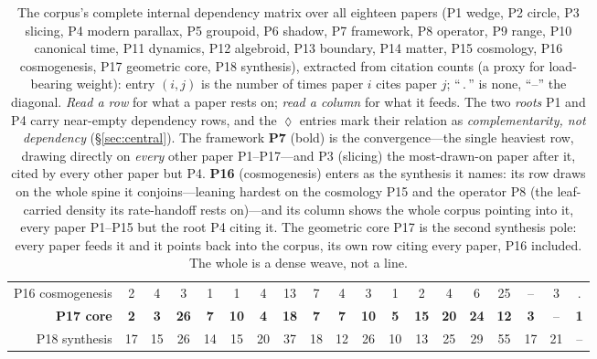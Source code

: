 \documentclass[11pt,a4paper]{article}
\theoremstyle{plain}
\theoremstyle{definition}
\theoremstyle{remark}
\begin{document}
\begin{table}[ht]
{\begin{tabular}{r|cccccccccccccccccc}
P16 \; cosmogenesis & 2 & 4 & 3 & 1 & 1 & 4 & 13 & 7 & 4 & 3 & 1 & 2 & 4 & 6 & 25 & -- & 3 & .\\
\textbf{P17 \; core} & \textbf{2} & \textbf{3} & \textbf{26} & \textbf{7} & \textbf{10} & \textbf{4} & \textbf{18} & \textbf{7} & \textbf{7} & \textbf{10} & \textbf{5} & \textbf{15} & \textbf{20} & \textbf{24} & \textbf{12} & \textbf{3} & -- & \textbf{1}\\
P18 \; synthesis & 17 & 15 & 26 & 14 & 15 & 20 & 37 & 18 & 12 & 26 & 10 & 13 & 25 & 29 & 55 & 17 & 21 & --\\
\end{tabular}%
}
\caption{The corpus's complete internal dependency matrix over all eighteen papers (P1 wedge, P2 circle, P3 slicing, P4 modern parallax, P5 groupoid, P6 shadow, P7 framework, P8 operator, P9 range, P10 canonical time, P11 dynamics, P12 algebroid, P13 boundary, P14 matter, P15 cosmology, P16 cosmogenesis, P17 geometric core, P18 synthesis), extracted from citation counts (a proxy for load-bearing weight): entry $(i,j)$ is the number of times paper $i$ cites paper $j$; ``\,.\,'' is none, ``--'' the diagonal. \emph{Read a row} for what a paper rests on; \emph{read a column} for what it feeds. The two \emph{roots} P1 and P4 carry near-empty dependency rows, and the $\lozenge$ entries mark their relation as \emph{complementarity, not dependency} (\S\ref{sec:central}). The framework \textbf{P7} (bold) is the convergence---the single heaviest row, drawing directly on \emph{every} other paper P1--P17---and P3 (slicing) the most-drawn-on paper after it, cited by every other paper but P4. \textbf{P16} (cosmogenesis) enters as the synthesis it names: its row draws on the whole spine it conjoins---leaning hardest on the cosmology P15 and the operator P8 (the leaf-carried density its rate-handoff rests on)---and its column shows the whole corpus pointing into it, every paper P1--P15 but the root P4 citing it. The geometric core P17 is the second synthesis pole: every paper feeds it and it points back into the corpus, its own row citing every paper, P16 included. The whole is a dense weave, not a line.}
\label{tab:dependency-matrix}
\end{table}
\end{document}
